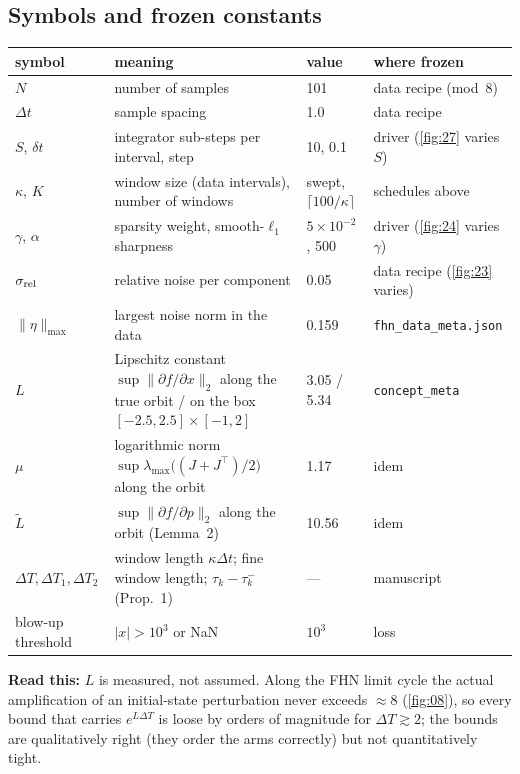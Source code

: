 \documentclass[10pt]{article}
\newcommand{\readthis}[1]{\textbf{Read this:} #1}
\begin{document}
\subsection{Symbols and frozen constants}
\begin{center}\small
\begin{tabular}{l p{} l l}
\toprule
symbol & meaning & value & where frozen \\
\midrule
$N$ & number of samples & 101 & data recipe (mod~8) \\
$\Delta t$ & sample spacing & 1.0 & data recipe \\
$S$, $\delta t$ & integrator sub-steps per interval, step & 10, 0.1 & driver (\ref{fig:27} varies $S$) \\
$\kappa$, $K$ & window size (data intervals), number of windows & swept, $\lceil100/\kappa\rceil$ & schedules above \\
$\gamma$, $\alpha$ & sparsity weight, smooth-$\ell_1$ sharpness & $5\times10^{-2}$, 500 & driver (\ref{fig:24} varies $\gamma$) \\
$\sigma_{\rm rel}$ & relative noise per component & 0.05 & data recipe (\ref{fig:23} varies) \\
$\lVert\eta\rVert_{\max}$ & largest noise norm in the data & 0.159 & \texttt{fhn\_data\_meta.json} \\
$L$ & Lipschitz constant $\sup\lVert\partial f/\partial x\rVert_2$ along the true orbit / on the box $[-2.5,2.5]\times[-1,2]$ & 3.05 / 5.34 & \texttt{concept\_meta} \\
$\mu$ & logarithmic norm $\sup\lambda_{\max}\big((J+J^\top)/2\big)$ along the orbit & 1.17 & idem \\
$\tilde L$ & $\sup\lVert\partial f/\partial p\rVert_2$ along the orbit (Lemma~2) & 10.56 & idem \\
$\Delta T,\Delta T_1,\Delta T_2$ & window length $\kappa\Delta t$; fine window length; $\tau_k-\tau_k^-$ (Prop.~1) & --- & manuscript \\
blow-up threshold & $|x|>10^3$ or NaN & $10^3$ & loss \\
\bottomrule
\end{tabular}
\end{center}
\readthis{$L$ is measured, not assumed. Along the FHN limit cycle the actual amplification of an initial-state perturbation never exceeds $\approx8$ (\ref{fig:08}), so every bound that carries $e^{L\Delta T}$ is loose by orders of magnitude for $\Delta T\gtrsim2$; the bounds are qualitatively right (they order the arms correctly) but not quantitatively tight.}
\end{document}
